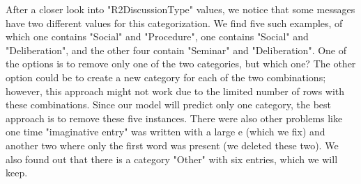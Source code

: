 \documentclass[fleqn,moreauthors,10pt]{ds_report}
\begin{document}
After a closer look into "R2DiscussionType" values, we notice that some messages have two different values for this categorization. We find five such examples, of which one contains "Social" and "Procedure", one contains "Social" and "Deliberation", and the other four contain "Seminar" and "Deliberation". One of the options is to remove only one of the two categories, but which one? The other option could be to create a new category for each of the two combinations; however, this approach might not work due to the limited number of rows with these combinations. Since our model will predict only one category, the best approach is to remove these five instances. There were also other problems like one time "imaginative entry" was written with a large e (which we fix) and another two where only the first word was present (we deleted these two). We also found out that there is a category "Other" with six entries, which we will keep.




\begin{table}[htbp]
    \centering
\vspace{0.2cm}
\caption{R2DiscussionType counts}
\label{tab:discussion_types}
\end{table}
\end{document}
